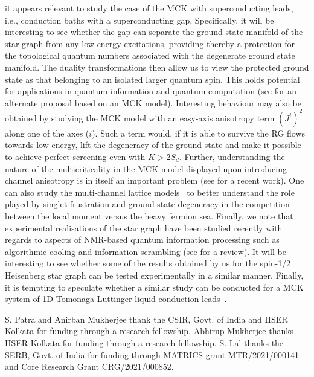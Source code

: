\documentclass[reprint,prb,superscriptaddress]{revtex4-2}
\begin{document}
it appears relevant to study the case of the MCK with superconducting leads, i.e., conduction baths with a superconducting gap. Specifically, it will be interesting to see whether the gap can separate the ground state manifold of the star graph from any low-energy excitations, providing thereby a protection for the topological quantum numbers associated with the degenerate ground state manifold. The duality transformations then allow us to view the protected ground state as that belonging to an isolated larger quantum spin. This holds potential for applications in quantum information and quantum computation (see \cite{lopes2020} for an alternate proposal based on an MCK model). Interesting behaviour may also be obtained by studying the MCK model with an easy-axis anisotropy term \(\left(J^i\right)^2\) along one of the axes ($i$).
Such a term would, if it is able to survive the RG flows towards low energy, lift the degeneracy of the ground state and make it possible to achieve perfect screening even with \(K > 2S_d\). Further, understanding the nature of the multicriticality in the MCK model displayed upon introducing channel anisotropy is in itself an important problem (see \cite{zheng2021} for a recent work).
One can also study the multi-channel lattice models~\cite{Piguet1997,shaw_1998} to better understand the role played by singlet frustration and ground state degeneracy in the competition between the local moment versus the heavy fermion sea. Finally, we note that experimental realisations of the star graph have been studied recently with regards to aspects of NMR-based quantum information processing such as algorithmic cooling and information scrambling (see \cite{mahesh2021} for a review). It will be interesting to see whether some of the results obtained by us for the spin-1/2 Heisenberg star graph can be tested experimentally in a similar manner. Finally, it is tempting to speculate whether a similar study can be conducted for a MCK system of 1D Tomonaga-Luttinger liquid conduction leads~\cite{lalbosonMCK2010}.

\acknowledgments
S. Patra and Anirban Mukherjee thank the CSIR, Govt. of India and IISER Kolkata for funding through a research fellowship. Abhirup Mukherjee thanks IISER Kolkata for funding through a research fellowship. S. Lal thanks the SERB, Govt. of India for funding through MATRICS grant MTR/2021/000141 and Core Research Grant CRG/2021/000852.
\end{document}
